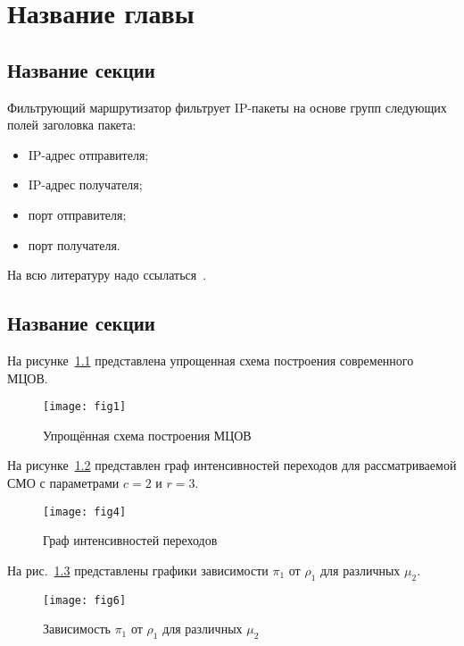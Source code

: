 
\chapter{Название главы}
\label{chap1}

\section{Название секции}
\label{chap1:sec1}

% 
Фильтрующий маршрутизатор фильтрует IP-пакеты на основе групп
следующих полей заголовка пакета:

\begin{itemize}
\item IP-адрес отправителя;
\item IP-адрес получателя;
\item порт отправителя;
\item порт получателя.
\end{itemize}

На всю литературу надо ссылаться~\cite{medvedovsky:1997:ataka, romanets:security}.

\section{Название секции}
\label{chap1:sec2}

%
На рисунке~\ref{fig1} представлена упрощенная схема построения
современного МЦОВ. 
\begin{figure}[h!]
 \centerline{\texttt{[image: fig1]}}
 \caption{Упрощённая схема построения МЦОВ}
\label{fig1}
\end{figure}

На рисунке~\ref{fig4} представлен граф интенсивностей переходов
для рассматриваемой СМО с параметрами $c = 2$ и $r = 3$.
\begin{figure}[h!]
 \centerline{\texttt{[image: fig4]}}
 \caption{Граф интенсивностей переходов}
\label{fig4}
\end{figure}

На рис.~\ref{fig6} представлены графики зависимости $\pi _1 $ от
$\rho _1 $ для различных $\mu _2 $.
\begin{figure}[!h]
\centerline{\texttt{[image: fig6]}}
\caption{Зависимость $\pi _1 $ от $\rho _1 $ для различных $\mu _2 $}
\label{fig6}
\end{figure}

